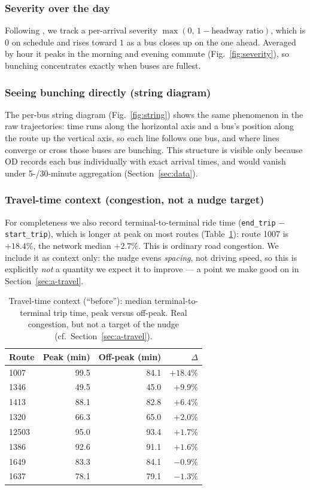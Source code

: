 \documentclass[final,5p,times,twocolumn,authoryear]{elsarticle}
\begin{document}
\subsubsection{Severity over the day}
\label{sec:b-sev}
Following \citet{Enayatollahi2019}, we track a per-arrival severity $\max(0,\,1-\text{headway ratio})$,
which is $0$ on schedule and rises toward $1$ as a bus closes up on the one ahead. Averaged by hour it
peaks in the morning and evening commute (Fig.~\ref{fig:severity}), so bunching concentrates exactly
when buses are fullest.

\subsubsection{Seeing bunching directly (string diagram)}
\label{sec:b-string}
The per-bus string diagram (Fig.~\ref{fig:string}) shows the same phenomenon in the raw trajectories:
time runs along the horizontal axis and a bus's position along the route up the vertical axis, so each
line follows one bus, and where lines converge or cross those buses are bunching. This structure is
visible only because OD records each bus individually with exact arrival times, and would vanish under
5-/30-minute aggregation (Section~\ref{sec:data}).

\subsubsection{Travel-time context (congestion, not a nudge target)}
\label{sec:b-travel}
For completeness we also record terminal-to-terminal ride time
(\texttt{end\_trip} $-$ \texttt{start\_trip}), which is longer at peak on most routes
(Table~\ref{tab:travel}): route 1007 is $+18.4\%$, the network median $+2.7\%$. This is ordinary road
congestion. We include it as context only: the nudge evens \emph{spacing}, not driving speed, so this
is explicitly \emph{not} a quantity we expect it to improve --- a point we make good on in
Section~\ref{sec:a-travel}.

\begin{table}[htbp]
\centering
\small
\caption{Travel-time context (``before''): median terminal-to-terminal trip time, peak versus
off-peak. Real congestion, but not a target of the nudge (cf.\ Section~\ref{sec:a-travel}).}
\label{tab:travel}
\begin{tabular}{lrrr}
\toprule
Route & Peak (min) & Off-peak (min) & $\Delta$ \\
\midrule
1007  & 99.5 & 84.1 & $+18.4\%$ \\
1346  & 49.5 & 45.0 & $+9.9\%$  \\
1413  & 88.1 & 82.8 & $+6.4\%$  \\
1320  & 66.3 & 65.0 & $+2.0\%$  \\
12503 & 95.0 & 93.4 & $+1.7\%$  \\
1386  & 92.6 & 91.1 & $+1.6\%$  \\
1649  & 83.3 & 84.1 & $-0.9\%$  \\
1637  & 78.1 & 79.1 & $-1.3\%$  \\
\bottomrule
\end{tabular}
\end{table}
\end{document}
